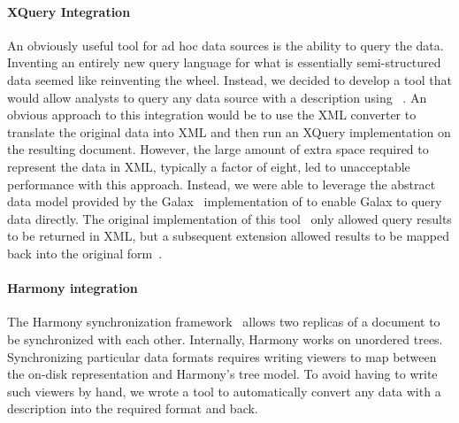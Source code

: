 \documentclass{sig-alternate}
\begin{document}
\paragraph{XQuery Integration}
An obviously useful tool for ad hoc data sources is the ability to
query the data.  Inventing an entirely new query language for what is
essentially semi-structured data seemed like reinventing the wheel.
Instead, we decided to develop a tool that would allow analysts to
query any data source with a \pads{} description using
\xquery{}~\cite{xquery}.  An obvious approach to this integration
would be to use the XML converter to translate the original data into
XML and then run an XQuery implementation on the resulting document.
However, the large amount of extra space required to represent the
data in XML, typically a factor of eight, led to unacceptable
performance with this approach.  Instead, we were able to leverage the
abstract data model provided by the Galax~\cite{galax} implementation
of \xquery{} to enable Galax to query \pads{} data directly.  The
original implementation of this tool~\cite{fernandez+:padx} only
allowed query results to be returned in XML, but a subsequent extension
allowed results to be mapped back into the original
form~\cite{fernandez+:padl}. 

\paragraph{Harmony integration}
The Harmony synchronization framework~\cite{harmony-web} allows
two replicas of a document to be synchronized with each other.
Internally, Harmony works on unordered trees.  Synchronizing
particular data formats requires writing viewers to map between the
on-disk representation and Harmony's tree model.  To avoid having to
write such viewers by hand, we wrote a tool to automatically convert
any data with a \pads{} description into the required format and
back. 
\end{document}
